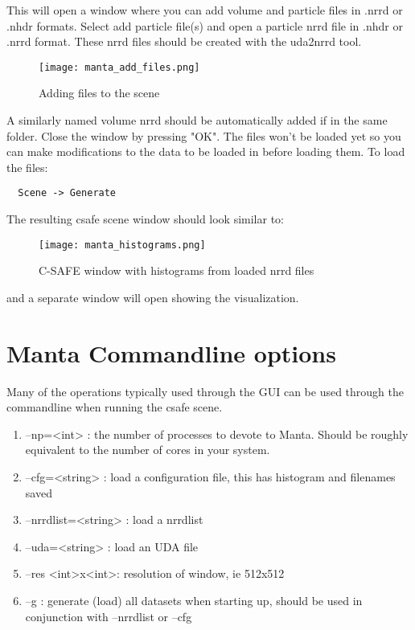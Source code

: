 This will open a window where you can add volume and particle files in .nrrd or .nhdr formats.  Select add particle file(s) and open a particle nrrd file in .nhdr or .nrrd format.  These nrrd files should be created with the uda2nrrd tool.

\begin{figure}[htbp]
  \center
  \texttt{[image: manta\_add\_files.png]}
  \caption{Adding files to the scene}
  \label{fig:manta_add_files}
\end{figure}

A similarly named volume nrrd should be automatically added if in the same folder.  Close the window by pressing "OK".  The files won't be loaded yet so you can make modifications to the data to be loaded in before loading them.  To load the files:

\begin{Verbatim}
  Scene -> Generate
\end{Verbatim}

The resulting csafe scene window should look similar to:

\begin{figure}[htbp]
  \center
  \texttt{[image: manta\_histograms.png]}
  \caption{C-SAFE window with histograms from loaded nrrd files}
  \label{fig:manta_histograms}
\end{figure}

and a separate window will open showing the visualization. 

\section{Manta Commandline options} 
Many of the operations typically used through the GUI can be used through the commandline when running the csafe scene.

\begin{enumerate}

\item
--np=<int>  : the number of processes to devote to Manta. Should be roughly equivalent to the number of cores in your system.
\item
--cfg=<string>  : load a configuration file, this has histogram and filenames saved
\item
--nrrdlist=<string>  : load a nrrdlist
\item
--uda=<string>  : load an UDA file
\item
--res <int>x<int>: resolution of window, ie 512x512
\item
--g  : generate (load) all datasets when starting up, should be used in conjunction with --nrrdlist or --cfg

\end{enumerate}

